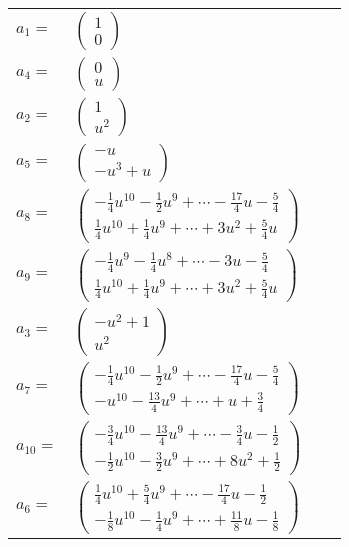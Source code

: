 \documentclass[1p]{elsarticle_modified}
\theoremstyle{definition}
\begin{document}
\begin{tabular}{m{7pt} m{180pt} m{7pt} m{180pt} }
\flushright $a_{1}=$&$\begin{pmatrix}1\\0\end{pmatrix}$ \\
\flushright $a_{4}=$&$\begin{pmatrix}0\\u\end{pmatrix}$ \\
\flushright $a_{2}=$&$\begin{pmatrix}1\\u^2\end{pmatrix}$ \\
\flushright $a_{5}=$&$\begin{pmatrix}- u\\- u^3+u\end{pmatrix}$ \\
\flushright $a_{8}=$&$\begin{pmatrix}-\frac{1}{4} u^{10}-\frac{1}{2} u^9+\cdots-\frac{17}{4} u-\frac{5}{4}\\\frac{1}{4} u^{10}+\frac{1}{4} u^9+\cdots+3 u^2+\frac{5}{4} u\end{pmatrix}$ \\
\flushright $a_{9}=$&$\begin{pmatrix}-\frac{1}{4} u^9-\frac{1}{4} u^8+\cdots-3 u-\frac{5}{4}\\\frac{1}{4} u^{10}+\frac{1}{4} u^9+\cdots+3 u^2+\frac{5}{4} u\end{pmatrix}$ \\
\flushright $a_{3}=$&$\begin{pmatrix}- u^2+1\\u^2\end{pmatrix}$ \\
\flushright $a_{7}=$&$\begin{pmatrix}-\frac{1}{4} u^{10}-\frac{1}{2} u^9+\cdots-\frac{17}{4} u-\frac{5}{4}\\- u^{10}-\frac{13}{4} u^9+\cdots+u+\frac{3}{4}\end{pmatrix}$ \\
\flushright $a_{10}=$&$\begin{pmatrix}-\frac{3}{4} u^{10}-\frac{13}{4} u^9+\cdots-\frac{3}{4} u-\frac{1}{2}\\-\frac{1}{2} u^{10}-\frac{3}{2} u^9+\cdots+8 u^2+\frac{1}{2}\end{pmatrix}$ \\
\flushright $a_{6}=$&$\begin{pmatrix}\frac{1}{4} u^{10}+\frac{5}{4} u^9+\cdots-\frac{17}{4} u-\frac{1}{2}\\-\frac{1}{8} u^{10}-\frac{1}{4} u^9+\cdots+\frac{11}{8} u-\frac{1}{8}\end{pmatrix}$ \\

\end{tabular}
\end{document}
